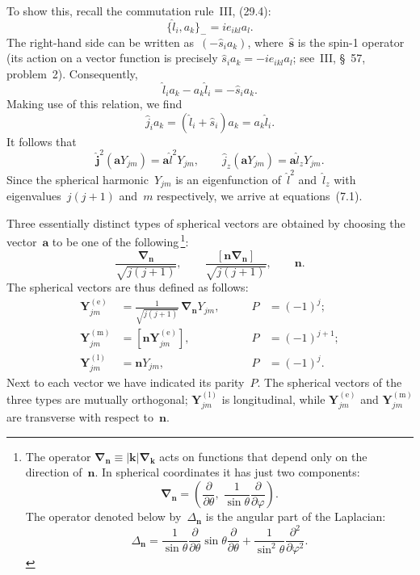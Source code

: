 To show this, recall the commutation rule~III, (29.4):
\[
\{\hat{l}_i, a_k\}_{-} = ie_{ikl}a_l.
\]
The right-hand side can be written as~$(-\hat{s}_ia_k)$, where~$\hat{\mathbf{s}}$ is the spin-1 operator (its action on a vector function is precisely $\hat{s}_ia_k = -ie_{ikl}a_l$; see~III, \S~57, problem~2). Consequently,
\[
\hat{l}_ia_k - a_k\hat{l}_i = -\hat{s}_ia_k.
\]
Making use of this relation, we find
\[
\hat{j}_ia_k = (\hat{l}_i + \hat{s}_i)a_k = a_k\hat{l}_i.
\]
It follows that
\[
\hat{\mathbf{j}}^2(\mathbf{a}Y_{jm}) = \mathbf{a}\hat{l}^2Y_{jm}, \qquad \hat{j}_z(\mathbf{a}Y_{jm}) = \mathbf{a}\hat{l}_zY_{jm}.
\]
Since the spherical harmonic~$Y_{jm}$ is an eigenfunction of~$\hat{l}^2$ and~$\hat{l}_z$ with eigenvalues~$j(j+1)$ and~$m$ respectively, we arrive at equations~(7.1).

Three essentially distinct types of spherical vectors are obtained by choosing the vector~$\mathbf{a}$ to be one of the following\,\footnote{The operator $\boldsymbol{\nabla}_\mathbf{n} \equiv |\mathbf{k}|\boldsymbol{\nabla}_\mathbf{k}$ acts on functions that depend only on the direction of~$\mathbf{n}$. In spherical coordinates it has just two components:
\[
\boldsymbol{\nabla}_\mathbf{n} = \left(\frac{\partial}{\partial\theta},\;\frac{1}{\sin\theta}\frac{\partial}{\partial\varphi}\right).
\]
The operator denoted below by~$\Delta_\mathbf{n}$ is the angular part of the Laplacian:
\[
\Delta_\mathbf{n} = \frac{1}{\sin\theta}\frac{\partial}{\partial\theta}\sin\theta\frac{\partial}{\partial\theta} + \frac{1}{\sin^2\theta}\frac{\partial^2}{\partial\varphi^2}.
\]}:
\begin{equation}
\frac{\boldsymbol{\nabla}_\mathbf{n}}{\sqrt{j(j+1)}},\qquad \frac{[\mathbf{n}\boldsymbol{\nabla}_\mathbf{n}]}{\sqrt{j(j+1)}},\qquad \mathbf{n}.
\tag{7.3}
\end{equation}
The spherical vectors are thus defined as follows:
\begin{equation}
\begin{aligned}
\mathbf{Y}_{jm}^{(\text{e})} &= \frac{1}{\sqrt{j(j+1)}}\,\boldsymbol{\nabla}_\mathbf{n} Y_{jm}, &\qquad P &= (-1)^j;\\
\mathbf{Y}_{jm}^{(\text{m})} &= [\mathbf{n}\mathbf{Y}_{jm}^{(\text{e})}], &\qquad P &= (-1)^{j+1};\\
\mathbf{Y}_{jm}^{(\text{l})} &= \mathbf{n}Y_{jm}, &\qquad P &= (-1)^j.
\end{aligned}
\tag{7.4}
\end{equation}
Next to each vector we have indicated its parity~$P$. The spherical vectors of the three types are mutually orthogonal; $\mathbf{Y}_{jm}^{(\text{l})}$ is longitudinal, while $\mathbf{Y}_{jm}^{(\text{e})}$ and $\mathbf{Y}_{jm}^{(\text{m})}$ are transverse with respect to~$\mathbf{n}$.

